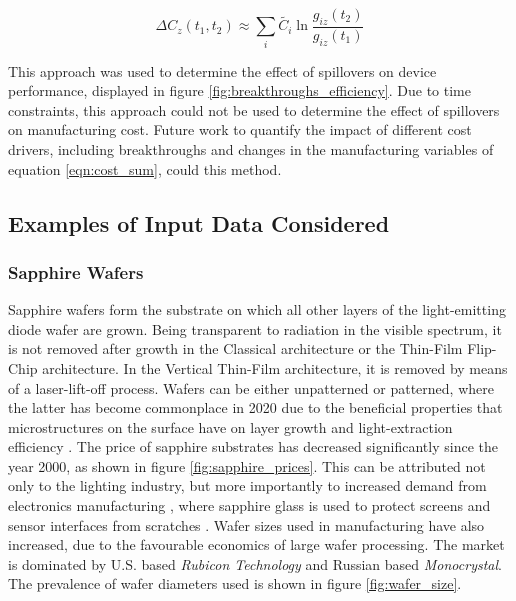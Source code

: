 \documentclass[10pt]{article}
\begin{document}
\begin{equation}
\Delta C_z (t_1,t_2) \approx \sum_i \tilde{C_i} \ln \frac{g_{iz}(t_2)}{g_{iz}(t_1)}
\end{equation}

This approach was used to determine the effect of spillovers on device performance, displayed in figure \ref{fig:breakthroughs_efficiency}. Due to time constraints, this approach could not be used to determine the effect of spillovers on manufacturing cost. Future work to quantify the impact of different cost drivers, including breakthroughs and changes in the manufacturing variables of equation \ref{eqn:cost_sum}, could this method.

\subsection{Examples of Input Data Considered}

\subsubsection{Sapphire Wafers}

Sapphire wafers form the substrate on which all other layers of the light-emitting diode wafer are grown. Being transparent to radiation in the visible spectrum, it is not removed after growth in the Classical architecture or the Thin-Film Flip-Chip architecture. In the Vertical Thin-Film architecture, it is removed by means of a laser-lift-off process. Wafers can be either unpatterned or patterned, where the latter has become commonplace in 2020 due to the beneficial properties that microstructures on the surface have on layer growth \cite{wuu2009defect} and light-extraction efficiency \cite{lee2006enhancing}. The price of sapphire substrates has decreased significantly since the year 2000, as shown in figure \ref{fig:sapphire_prices}. This can be attributed not only to the lighting industry, but more importantly to increased demand from electronics manufacturing \cite{yole2015sapphire}, where sapphire glass is used to protect screens and sensor interfaces from scratches \cite{khattak2016world}. Wafer sizes used in manufacturing have also increased, due to the favourable economics of large wafer processing. The market is dominated by U.S. based \textit{Rubicon Technology} and Russian based \textit{Monocrystal}. The prevalence of wafer diameters used is shown in figure \ref{fig:wafer_size}.
\end{document}
